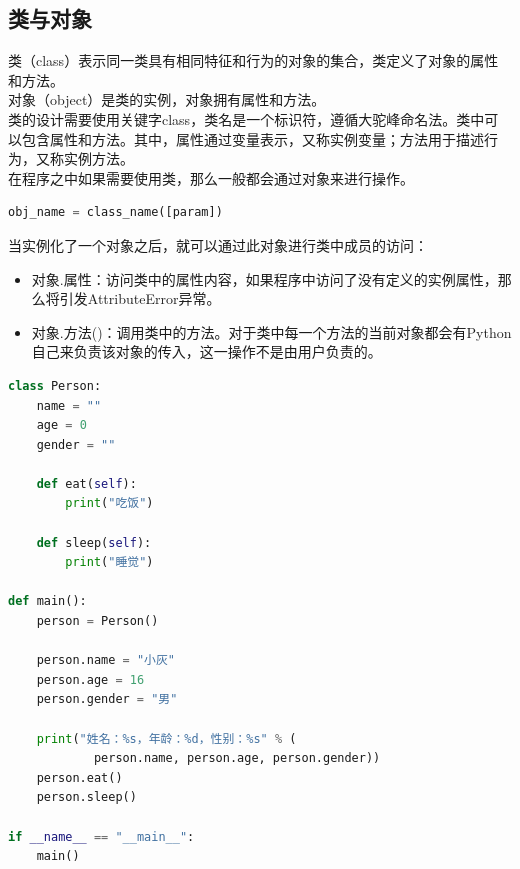 \subsection{类与对象}

类（class）表示同一类具有相同特征和行为的对象的集合，类定义了对象的属性和方法。\\

对象（object）是类的实例，对象拥有属性和方法。\\

类的设计需要使用关键字class，类名是一个标识符，遵循大驼峰命名法。类中可以包含属性和方法。其中，属性通过变量表示，又称实例变量；方法用于描述行为，又称实例方法。\\

在程序之中如果需要使用类，那么一般都会通过对象来进行操作。

\vspace{-0.5cm}

\begin{lstlisting}[language=Python]
obj_name = class_name([param])
\end{lstlisting}

当实例化了一个对象之后，就可以通过此对象进行类中成员的访问：

\begin{itemize}
	\item 对象.属性：访问类中的属性内容，如果程序中访问了没有定义的实例属性，那么将引发AttributeError异常。

	\item 对象.方法()：调用类中的方法。对于类中每一个方法的当前对象都会有Python自己来负责该对象的传入，这一操作不是由用户负责的。
\end{itemize}

\vspace{0.5cm}


\begin{lstlisting}[language=Python]
class Person:
    name = ""
    age = 0
    gender = ""

    def eat(self):
        print("吃饭")
    
    def sleep(self):
        print("睡觉")

def main():
    person = Person()
    
    person.name = "小灰"
    person.age = 16
    person.gender = "男"
    
    print("姓名：%s，年龄：%d，性别：%s" % (
            person.name, person.age, person.gender))
    person.eat()
    person.sleep()

if __name__ == "__main__":
    main()
\end{lstlisting}

